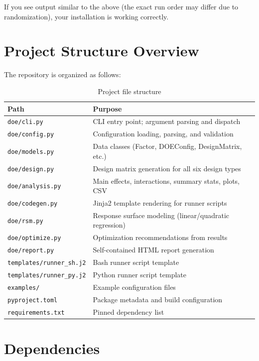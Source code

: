 \documentclass[11pt]{book}
\begin{document}
If you see output similar to the above (the exact run order may differ due to randomization), your installation is working correctly.

\section{Project Structure Overview}

The repository is organized as follows:

\begin{table}[H]
\centering
\caption{Project file structure}
\begin{tabular}{@{}ll@{}}
\toprule
\textbf{Path} & \textbf{Purpose} \\
\midrule
\texttt{doe/cli.py}       & CLI entry point; argument parsing and dispatch \\
\texttt{doe/config.py}    & Configuration loading, parsing, and validation \\
\texttt{doe/models.py}    & Data classes (Factor, DOEConfig, DesignMatrix, etc.) \\
\texttt{doe/design.py}    & Design matrix generation for all six design types \\
\texttt{doe/analysis.py}  & Main effects, interactions, summary stats, plots, CSV \\
\texttt{doe/codegen.py}   & Jinja2 template rendering for runner scripts \\
\texttt{doe/rsm.py}       & Response surface modeling (linear/quadratic regression) \\
\texttt{doe/optimize.py}  & Optimization recommendations from results \\
\texttt{doe/report.py}    & Self-contained HTML report generation \\
\texttt{templates/runner\_sh.j2} & Bash runner script template \\
\texttt{templates/runner\_py.j2} & Python runner script template \\
\texttt{examples/}        & Example configuration files \\
\texttt{pyproject.toml}   & Package metadata and build configuration \\
\texttt{requirements.txt} & Pinned dependency list \\
\bottomrule
\end{tabular}
\end{table}

\section{Dependencies}
\end{document}
